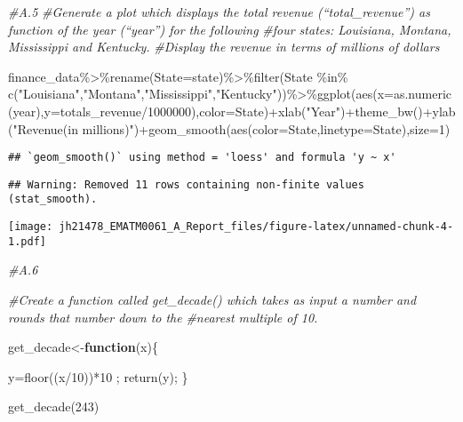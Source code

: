 \documentclass[
]{article}
\newenvironment{Shaded}{\begin{snugshade}}{\end{snugshade}}
\newcommand{\AttributeTok}[1]{\textcolor[rgb]{0.77,0.63,0.00}{#1}}
\newcommand{\CommentTok}[1]{\textcolor[rgb]{0.56,0.35,0.01}{\textit{#1}}}
\newcommand{\ControlFlowTok}[1]{\textcolor[rgb]{0.13,0.29,0.53}{\textbf{#1}}}
\newcommand{\DecValTok}[1]{\textcolor[rgb]{0.00,0.00,0.81}{#1}}
\newcommand{\FunctionTok}[1]{\textcolor[rgb]{0.00,0.00,0.00}{#1}}
\newcommand{\NormalTok}[1]{#1}
\newcommand{\OtherTok}[1]{\textcolor[rgb]{0.56,0.35,0.01}{#1}}
\newcommand{\SpecialCharTok}[1]{\textcolor[rgb]{0.00,0.00,0.00}{#1}}
\newcommand{\StringTok}[1]{\textcolor[rgb]{0.31,0.60,0.02}{#1}}
\begin{document}
\begin{Shaded}
\begin{Highlighting}[]
\CommentTok{\#A.5}
\CommentTok{\#Generate a plot which displays the total revenue (“total\_revenue”) as function of the year (“year”) for the following}
\CommentTok{\#four states: Louisiana, Montana, Mississippi and Kentucky.}
\CommentTok{\#Display the revenue in terms of millions of dollars}

\NormalTok{finance\_data}\SpecialCharTok{\%\textgreater{}\%}\FunctionTok{rename}\NormalTok{(}\AttributeTok{State=}\NormalTok{state)}\SpecialCharTok{\%\textgreater{}\%}\FunctionTok{filter}\NormalTok{(State }\SpecialCharTok{\%in\%} \FunctionTok{c}\NormalTok{(}\StringTok{"Louisiana"}\NormalTok{,}\StringTok{"Montana"}\NormalTok{,}\StringTok{"Mississippi"}\NormalTok{,}\StringTok{"Kentucky"}\NormalTok{))}\SpecialCharTok{\%\textgreater{}\%}\FunctionTok{ggplot}\NormalTok{(}\FunctionTok{aes}\NormalTok{(}\AttributeTok{x=}\FunctionTok{as.numeric}\NormalTok{(year),}\AttributeTok{y=}\NormalTok{totals\_revenue}\SpecialCharTok{/}\DecValTok{1000000}\NormalTok{),}\AttributeTok{color=}\NormalTok{State)}\SpecialCharTok{+}\FunctionTok{xlab}\NormalTok{(}\StringTok{"Year"}\NormalTok{)}\SpecialCharTok{+}\FunctionTok{theme\_bw}\NormalTok{()}\SpecialCharTok{+}\FunctionTok{ylab}\NormalTok{(}\StringTok{"Revenue(in millions)"}\NormalTok{)}\SpecialCharTok{+}\FunctionTok{geom\_smooth}\NormalTok{(}\FunctionTok{aes}\NormalTok{(}\AttributeTok{color=}\NormalTok{State,}\AttributeTok{linetype=}\NormalTok{State),}\AttributeTok{size=}\DecValTok{1}\NormalTok{)}
\end{Highlighting}
\end{Shaded}

\begin{verbatim}
## `geom_smooth()` using method = 'loess' and formula 'y ~ x'
\end{verbatim}

\begin{verbatim}
## Warning: Removed 11 rows containing non-finite values (stat_smooth).
\end{verbatim}

\texttt{[image: jh21478\_EMATM0061\_A\_Report\_files/figure-latex/unnamed-chunk-4-1.pdf]}

\begin{Shaded}
\begin{Highlighting}[]
\CommentTok{\#A.6}

\CommentTok{\#Create a function called get\_decade() which takes as input a number and rounds that number down to the}
\CommentTok{\#nearest multiple of 10. }

\NormalTok{get\_decade}\OtherTok{\textless{}{-}}\ControlFlowTok{function}\NormalTok{(x)\{}
 
\NormalTok{  y}\OtherTok{=}\FunctionTok{floor}\NormalTok{((x}\SpecialCharTok{/}\DecValTok{10}\NormalTok{))}\SpecialCharTok{*}\DecValTok{10}\NormalTok{  ;}
  \FunctionTok{return}\NormalTok{(y);}
\NormalTok{\}}

\FunctionTok{get\_decade}\NormalTok{(}\DecValTok{243}\NormalTok{)}
\end{Highlighting}
\end{Shaded}
\end{document}
